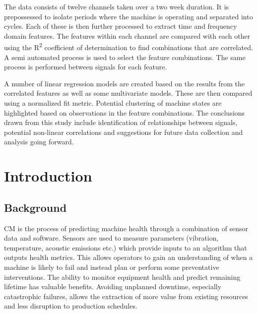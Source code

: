 \documentclass[]{article}
\begin{document}
The data consists of twelve channels taken over a two week duration. It is prepossessed to isolate periods where the machine is operating and separated into cycles. Each of these is then further processed to extract time and frequency domain features. The features within each channel are compared with each other using the R\textsuperscript{2} coefficient of determination to find combinations that are correlated. A semi automated process is used to select the feature combinations. The same process is performed between signals for each feature. 

A number of linear regression models are created based on the results from the correlated features as well as some multivariate models. These are then compared using a normalized fit metric. Potential clustering of machine states are highlighted based on observations in the feature combinations. The conclusions drawn from this study include identification of relationships between signals, potential non-linear correlations and suggestions for future data collection and analysis going forward.
\clearpage

\setcounter{tocdepth}{3}
\tableofcontents
\newpage

\listoffigures
\listoftables
\newpage

\printnoidxglossary[type=\acronymtype, style=list, nogroupskip=true]
\newpage


\section{Introduction}
\subsection{Background}
\gls{CM} is the process of predicting machine health through a combination of sensor data and software. Sensors are used to measure parameters (vibration, temperature, acoustic emissions etc.) which provide inputs to an algorithm that outputs health metrics. This allows operators to gain an understanding of when a machine is likely to fail and instead plan or perform some preventative interventions. The ability to monitor equipment health and predict remaining lifetime has valuable benefits. Avoiding unplanned downtime, especially catastrophic failures, allows the extraction of more value from existing resources and less disruption to production schedules.
\end{document}
